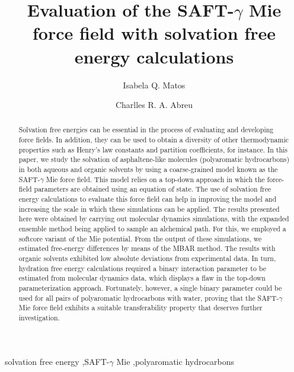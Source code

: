 \documentclass[final,12p,times,twocolumn]{elsarticle}
\begin{document}
	
	\begin{frontmatter}
		
		\title{Evaluation of the SAFT-$\gamma$ Mie force field with solvation free energy calculations}%
		
		\author{Isabela Q. Matos}
		\author{Charlles R. A. Abreu }
		\address{Chemical Engineering Department, Escola de Qu\'{\i}mica, Universidade Federal do Rio de Janeiro, Av. Athos da Silveira Ramos 149, Rio de Janeiro, RJ 21941-909, Brazil}
		
		
		\begin{abstract}
Solvation free energies can be essential in the process of evaluating and developing force fields. In addition, they can be used to obtain a diversity of other thermodynamic properties such as Henry's law constants and partition coefficients, for instance. In this paper, we study the solvation of asphaltene-like molecules (polyaromatic hydrocarbons) in both aqueous and organic solvents by using a coarse-grained model known as the SAFT-$\gamma$ Mie force field. This model relies on a top-down approach in which the force-field parameters are obtained using an equation of state. The use of solvation free energy calculations to evaluate this force field can help in improving the model and increasing the scale in which these simulations can be applied. The results presented here were obtained by carrying out molecular dynamics simulations, with the expanded ensemble method being applied to sample an alchemical path. For this, we employed a softcore variant of the Mie potential. From the output of these simulations, we estimated free-energy differences by means of the MBAR method. The results with organic solvents exhibited low absolute deviations from experimental data. In turn, hydration free energy calculations required a binary interaction parameter to be estimated from molecular dynamics data, which displays a flaw in the top-down parameterization approach. Fortunately, however, a single binary parameter could be used for all pairs of polyaromatic hydrocarbons with water, proving that the SAFT-$\gamma$ Mie force field exhibits a suitable transferability property that deserves further investigation.
		\end{abstract}
		
		
		
		\begin{keyword}
			solvation free energy \sep SAFT-$\gamma$ Mie \sep polyaromatic hydrocarbons
		\end{keyword}
		
	\end{frontmatter}
	
\end{document}
